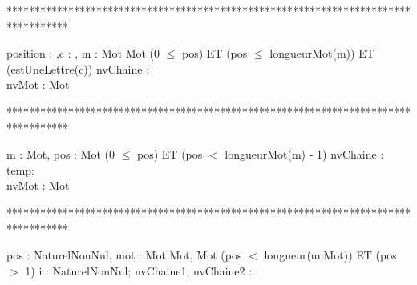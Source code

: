 ***********************************************************************************
\begin{algorithme}%
       {position : \naturelNonNul,c : \caractere, m : Mot}%
       {Mot}%
       {(0 $\leq$ pos) ET (pos $\leq$ longueurMot(m)) ET (estUneLettre(c))}
       {nvChaine : \chaine \\ nvMot : Mot}
       {
       }
\end{algorithme}

***********************************************************************************
\begin{algorithme}%
      {m : Mot, pos : \naturelNonNul}%
      {Mot}%
      {(0 $\leq$ pos) ET (pos $<$ longueurMot(m) - 1)}%
      {nvChaine : \chaine \\ temp: \caractere \\ nvMot : Mot}%
      {
      }
\end{algorithme}

***********************************************************************************
\begin{algorithme}
         {pos : NaturelNonNul, mot : Mot}%
         {Mot, Mot}%
         {(pos $<$ longueur(unMot)) ET (pos $>$ 1)}%
         {i : NaturelNonNul; nvChaine1, nvChaine2 : \chaine}%
         {
            {
            }
            {
            }
          }
\end{algorithme}
